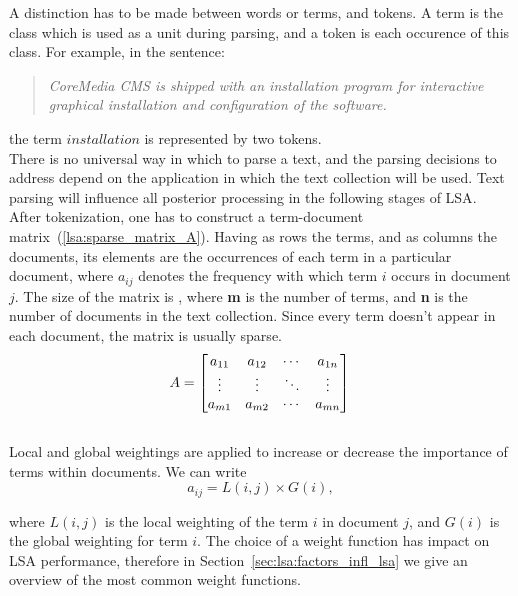 A distinction has to be made between words or terms, and tokens. A term is the class which is used as a unit during parsing, and a token is each occurence of this class. For example, in the sentence: 

\begin{quote}
\textit{CoreMedia CMS is shipped with an installation program for interactive graphical installation and configuration of the software.}
\end{quote}

the term $ installation $ is represented by two tokens. \\

There is no universal way in which to parse a text, and the parsing decisions to address depend on the application in which the text collection will be used. Text parsing will influence all posterior processing in the following stages of \gls{LSA}. \\

After tokenization, one has to construct a term-document matrix~(\ref{lsa:sparse_matrix_A}). Having as rows the terms, and as columns the documents, its elements are the occurrences of each term in a particular document, where $ a_{ij} $ denotes the frequency with which term $ i $ occurs in document $ j $. The size of the matrix is , where {\bf m} is the number of terms, and {\bf n} is the number of documents in the text collection. Since every term doesn't appear in each document, the matrix is usually sparse. \\

%
%
\begin{equation}
A=
\begin{bmatrix}
\label{lsa:sparse_matrix_A}
 a_{11}& a_{12}& \cdots& a_{1n} \\
 \vdots& \vdots& \ddots& \vdots \\ 
 a_{m1}& a_{m2}& \cdots& a_{mn}
\end{bmatrix}\\
\end{equation}\\

Local and global weightings are applied to increase or decrease the importance of terms within documents. We can write
%
%
\begin{equation}
\label{lsa:global_local_weighting}
a_{ij}=L(i,j) \times G(i),
\end{equation}

where $L(i,j)$ is the local weighting of the term $i$ in document $j$, and $G(i)$ is the global weighting for term $i$. The choice of a weight function has impact on \gls{LSA} performance, therefore in Section~\ref{sec:lsa:factors_infl_lsa} we give an overview of the most common weight functions. \\

